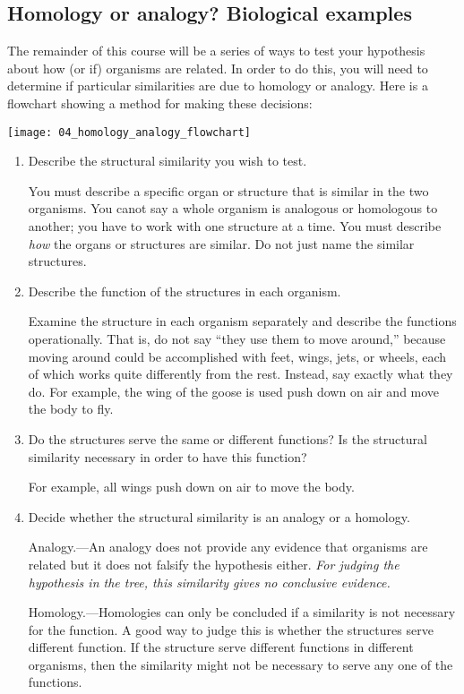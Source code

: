 \documentclass[12pt, hidelinks]{exam}
\begin{document}
\subsection*{Homology or analogy? Biological examples}

The remainder of this course will be a series of ways to test your
hypothesis about how (or if) organisms are related. In order to do this,
you will need to determine if particular similarities are due to homology
or analogy. Here is a flowchart showing a method for making these
decisions:

\begin{center}
	\texttt{[image: 04\_homology\_analogy\_flowchart]}
\end{center}

\begin{enumerate}

\item
	Describe the structural similarity you wish to test.

    You must describe a specific organ or structure that is similar in the two organisms.
    You canot say a whole organism is analogous or homologous to
    another; you have to work with one structure at a time. You must describe
    \emph{how} the organs or structures are similar. Do not just name the similar structures. 

\item
  Describe the function of the structures in each organism.

    Examine the structure in each organism separately and describe the functions
    operationally. That is, do not say ``they use them to
    move around,'' because moving around could be accomplished with feet,
    wings, jets, or wheels, each of which works quite differently from
    the rest. Instead, say exactly what they do. For example, the wing
    of the goose is used push down on air and move the
    body to fly.

\item
  Do the structures serve the same or different functions? 
  Is the structural similarity necessary in order to have this function?

    For example, all wings push down on air to move the body.

\item Decide whether the structural similarity is an analogy or a homology.

	  Analogy.---An analogy does not provide any evidence
  that organisms are related but it does not falsify the hypothesis
  either. \emph{For judging the hypothesis in the tree, this
  similarity gives no conclusive evidence.}
	
	  Homology.---Homologies can only be concluded if a similarity
  is not necessary for the function. A good way to judge this is whether the 
  structures serve different function. If the structure serve different functions
  in different organisms, then the similarity might not be necessary to serve any 
  one of the functions. 

\end{enumerate}
\end{document}
